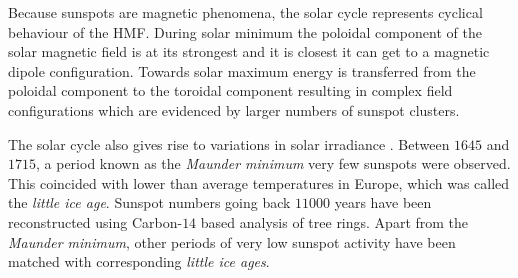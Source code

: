 Because sunspots are magnetic phenomena, the solar cycle represents cyclical behaviour of the HMF. During solar 
minimum the poloidal component of the solar magnetic field is at its strongest and it is closest it can get to 
a magnetic dipole configuration. Towards solar maximum energy is transferred from the poloidal component to the 
toroidal component resulting in complex field configurations which are evidenced by larger numbers of sunspot 
clusters.

The solar cycle also gives rise to variations in solar irradiance \citep{solarirradiance}. Between $1645$ and 
$1715$, a period known as the \emph{Maunder minimum} very few sunspots were observed. This coincided with lower 
than average temperatures in Europe, which was called the \emph{little ice age}. Sunspot numbers going back $11000$ 
years have been reconstructed using Carbon-$14$ based analysis of tree rings. Apart from the \emph{Maunder minimum},
other periods of very low sunspot activity have been matched with corresponding \emph{little ice ages}.

\clearpage

%
%
